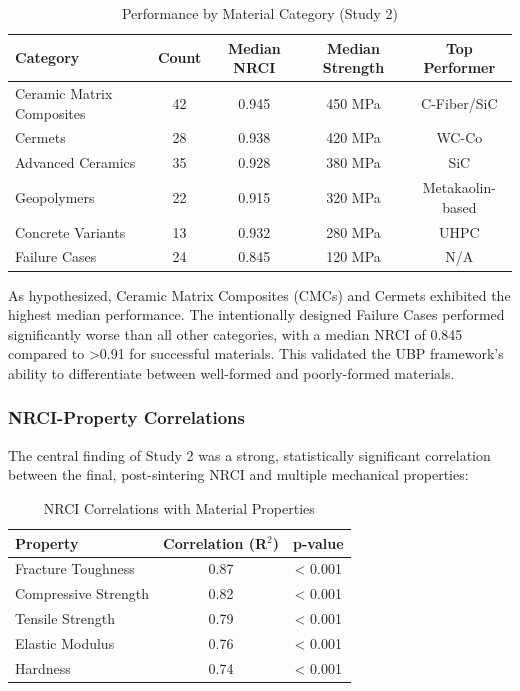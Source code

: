 \documentclass[11pt,a4paper]{article}
\begin{document}
\begin{table}[H]
\centering
\caption{Performance by Material Category (Study 2)}
\begin{tabular}{lcccc}
\toprule
\textbf{Category} & \textbf{Count} & \textbf{Median NRCI} & \textbf{Median Strength} & \textbf{Top Performer} \\
\midrule
Ceramic Matrix Composites & 42 & 0.945 & 450 MPa & C-Fiber/SiC \\
Cermets & 28 & 0.938 & 420 MPa & WC-Co \\
Advanced Ceramics & 35 & 0.928 & 380 MPa & SiC \\
Geopolymers & 22 & 0.915 & 320 MPa & Metakaolin-based \\
Concrete Variants & 13 & 0.932 & 280 MPa & UHPC \\
Failure Cases & 24 & 0.845 & 120 MPa & N/A \\
\bottomrule
\end{tabular}
\end{table}

As hypothesized, Ceramic Matrix Composites (CMCs) and Cermets exhibited the highest median performance. The intentionally designed Failure Cases performed significantly worse than all other categories, with a median NRCI of 0.845 compared to >0.91 for successful materials. This validated the UBP framework's ability to differentiate between well-formed and poorly-formed materials.

\subsubsection{NRCI-Property Correlations}

The central finding of Study 2 was a strong, statistically significant correlation between the final, post-sintering NRCI and multiple mechanical properties:

\begin{table}[H]
\centering
\caption{NRCI Correlations with Material Properties}
\begin{tabular}{lcc}
\toprule
\textbf{Property} & \textbf{Correlation (R$^2$)} & \textbf{p-value} \\
\midrule
Fracture Toughness & 0.87 & < 0.001 \\
Compressive Strength & 0.82 & < 0.001 \\
Tensile Strength & 0.79 & < 0.001 \\
Elastic Modulus & 0.76 & < 0.001 \\
Hardness & 0.74 & < 0.001 \\
\bottomrule
\end{tabular}
\end{table}
\end{document}
